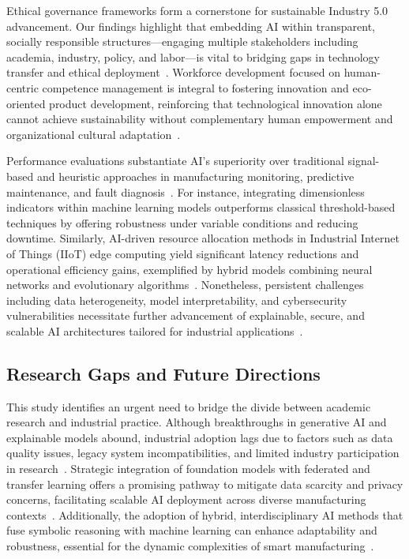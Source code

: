 \documentclass[sigconf]{acmart}
\begin{document}
Ethical governance frameworks form a cornerstone for sustainable Industry 5.0 advancement. Our findings highlight that embedding AI within transparent, socially responsible structures—engaging multiple stakeholders including academia, industry, policy, and labor—is vital to bridging gaps in technology transfer and ethical deployment~\cite{ref3,ref25,ref38}. Workforce development focused on human-centric competence management is integral to fostering innovation and eco-oriented product development, reinforcing that technological innovation alone cannot achieve sustainability without complementary human empowerment and organizational cultural adaptation~\cite{ref19,ref21,ref14}.

Performance evaluations substantiate AI's superiority over traditional signal-based and heuristic approaches in manufacturing monitoring, predictive maintenance, and fault diagnosis~\cite{ref4,ref24,ref32}. For instance, integrating dimensionless indicators within machine learning models outperforms classical threshold-based techniques by offering robustness under variable conditions and reducing downtime. Similarly, AI-driven resource allocation methods in Industrial Internet of Things (IIoT) edge computing yield significant latency reductions and operational efficiency gains, exemplified by hybrid models combining neural networks and evolutionary algorithms~\cite{ref31,ref34}. Nonetheless, persistent challenges including data heterogeneity, model interpretability, and cybersecurity vulnerabilities necessitate further advancement of explainable, secure, and scalable AI architectures tailored for industrial applications~\cite{ref29,ref35,ref39}.

\subsection{Research Gaps and Future Directions}

This study identifies an urgent need to bridge the divide between academic research and industrial practice. Although breakthroughs in generative AI and explainable models abound, industrial adoption lags due to factors such as data quality issues, legacy system incompatibilities, and limited industry participation in research~\cite{ref3,ref7}. Strategic integration of foundation models with federated and transfer learning offers a promising pathway to mitigate data scarcity and privacy concerns, facilitating scalable AI deployment across diverse manufacturing contexts~\cite{ref5,ref8}. Additionally, the adoption of hybrid, interdisciplinary AI methods that fuse symbolic reasoning with machine learning can enhance adaptability and robustness, essential for the dynamic complexities of smart manufacturing~\cite{ref35,ref37}.
\end{document}
